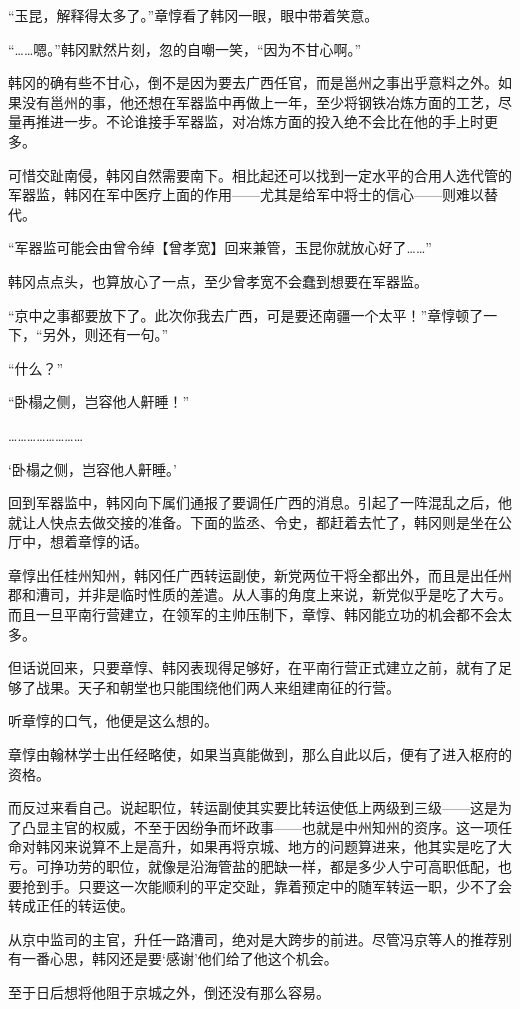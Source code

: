 “玉昆，解释得太多了。”章惇看了韩冈一眼，眼中带着笑意。

“……嗯。”韩冈默然片刻，忽的自嘲一笑，“因为不甘心啊。”

韩冈的确有些不甘心，倒不是因为要去广西任官，而是邕州之事出乎意料之外。如果没有邕州的事，他还想在军器监中再做上一年，至少将钢铁冶炼方面的工艺，尽量再推进一步。不论谁接手军器监，对冶炼方面的投入绝不会比在他的手上时更多。

可惜交趾南侵，韩冈自然需要南下。相比起还可以找到一定水平的合用人选代管的军器监，韩冈在军中医疗上面的作用——尤其是给军中将士的信心——则难以替代。

“军器监可能会由曾令绰【曾孝宽】回来兼管，玉昆你就放心好了……”

韩冈点点头，也算放心了一点，至少曾孝宽不会蠢到想要在军器监。

“京中之事都要放下了。此次你我去广西，可是要还南疆一个太平！”章惇顿了一下，“另外，则还有一句。”

“什么？”

“卧榻之侧，岂容他人鼾睡！”

……………………

‘卧榻之侧，岂容他人鼾睡。’

回到军器监中，韩冈向下属们通报了要调任广西的消息。引起了一阵混乱之后，他就让人快点去做交接的准备。下面的监丞、令史，都赶着去忙了，韩冈则是坐在公厅中，想着章惇的话。

章惇出任桂州知州，韩冈任广西转运副使，新党两位干将全都出外，而且是出任州郡和漕司，并非是临时性质的差遣。从人事的角度上来说，新党似乎是吃了大亏。而且一旦平南行营建立，在领军的主帅压制下，章惇、韩冈能立功的机会都不会太多。

但话说回来，只要章惇、韩冈表现得足够好，在平南行营正式建立之前，就有了足够了战果。天子和朝堂也只能围绕他们两人来组建南征的行营。

听章惇的口气，他便是这么想的。

章惇由翰林学士出任经略使，如果当真能做到，那么自此以后，便有了进入枢府的资格。

而反过来看自己。说起职位，转运副使其实要比转运使低上两级到三级——这是为了凸显主官的权威，不至于因纷争而坏政事——也就是中州知州的资序。这一项任命对韩冈来说算不上是高升，如果再将京城、地方的问题算进来，他其实是吃了大亏。可挣功劳的职位，就像是沿海管盐的肥缺一样，都是多少人宁可高职低配，也要抢到手。只要这一次能顺利的平定交趾，靠着预定中的随军转运一职，少不了会转成正任的转运使。

从京中监司的主官，升任一路漕司，绝对是大跨步的前进。尽管冯京等人的推荐别有一番心思，韩冈还是要‘感谢’他们给了他这个机会。

至于日后想将他阻于京城之外，倒还没有那么容易。

